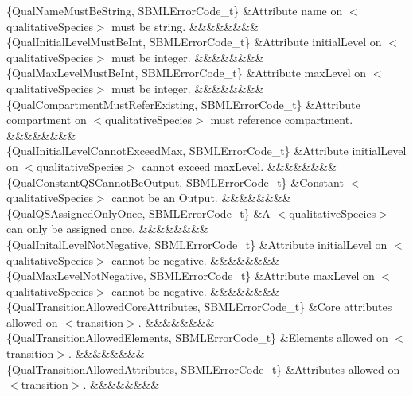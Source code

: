 \begin{DoxyParagraph}{}
\begin{longtabu}
\{Qual\+Name\+Must\+Be\+String, S\+B\+M\+L\+Error\+Code\+\_\+t\} &Attribute \textquotesingle{}name\textquotesingle{} on {\ttfamily $<$qualitative\+Species$>$} must be string. &&&&&&&&\\
\{Qual\+Initial\+Level\+Must\+Be\+Int, S\+B\+M\+L\+Error\+Code\+\_\+t\} &Attribute \textquotesingle{}initial\+Level\textquotesingle{} on {\ttfamily $<$qualitative\+Species$>$} must be integer. &&&&&&&&\\
\{Qual\+Max\+Level\+Must\+Be\+Int, S\+B\+M\+L\+Error\+Code\+\_\+t\} &Attribute \textquotesingle{}max\+Level\textquotesingle{} on {\ttfamily $<$qualitative\+Species$>$} must be integer. &&&&&&&&\\
\{Qual\+Compartment\+Must\+Refer\+Existing, S\+B\+M\+L\+Error\+Code\+\_\+t\} &Attribute \textquotesingle{}compartment\textquotesingle{} on {\ttfamily $<$qualitative\+Species$>$} must reference compartment. &&&&&&&&\\
\{Qual\+Initial\+Level\+Cannot\+Exceed\+Max, S\+B\+M\+L\+Error\+Code\+\_\+t\} &Attribute \textquotesingle{}initial\+Level\textquotesingle{} on {\ttfamily $<$qualitative\+Species$>$} cannot exceed max\+Level. &&&&&&&&\\
\{Qual\+Constant\+Q\+S\+Cannot\+Be\+Output, S\+B\+M\+L\+Error\+Code\+\_\+t\} &Constant {\ttfamily $<$qualitative\+Species$>$} cannot be an Output. &&&&&&&&\\
\{Qual\+Q\+S\+Assigned\+Only\+Once, S\+B\+M\+L\+Error\+Code\+\_\+t\} &A {\ttfamily $<$qualitative\+Species$>$} can only be assigned once. &&&&&&&&\\
\{Qual\+Inital\+Level\+Not\+Negative, S\+B\+M\+L\+Error\+Code\+\_\+t\} &Attribute \textquotesingle{}initial\+Level\textquotesingle{} on {\ttfamily $<$qualitative\+Species$>$} cannot be negative. &&&&&&&&\\
\{Qual\+Max\+Level\+Not\+Negative, S\+B\+M\+L\+Error\+Code\+\_\+t\} &Attribute \textquotesingle{}max\+Level\textquotesingle{} on {\ttfamily $<$qualitative\+Species$>$} cannot be negative. &&&&&&&&\\
\{Qual\+Transition\+Allowed\+Core\+Attributes, S\+B\+M\+L\+Error\+Code\+\_\+t\} &Core attributes allowed on {\ttfamily $<$transition$>$}. &&&&&&&&\\
\{Qual\+Transition\+Allowed\+Elements, S\+B\+M\+L\+Error\+Code\+\_\+t\} &Elements allowed on {\ttfamily $<$transition$>$}. &&&&&&&&\\
\{Qual\+Transition\+Allowed\+Attributes, S\+B\+M\+L\+Error\+Code\+\_\+t\} &Attributes allowed on {\ttfamily $<$transition$>$}. &&&&&&&&\\

\end{longtabu}
\end{DoxyParagraph}
